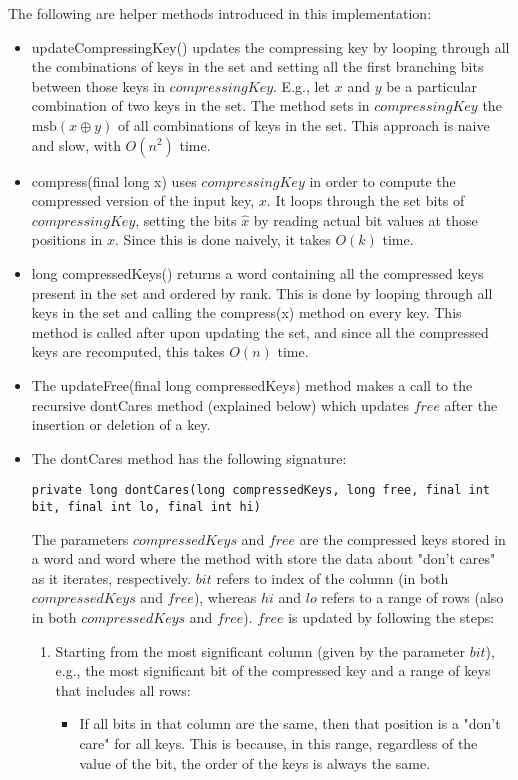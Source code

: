 The following are helper methods introduced in this implementation:
\begin{itemize}
    \item
    {\ttfamily updateCompressingKey()} updates the compressing key by looping through all the combinations of keys in the set and setting all the first branching bits between those keys in $compressingKey$. E.g., let $x$ and $y$ be a particular combination of two keys in the set. The method sets in $compressingKey$ the $\text{msb}(x \oplus y)$ of all combinations of keys in the set. This approach is naive and slow, with $O(n^2)$ time.
    
    \item
    {\ttfamily compress(final long x)} uses $compressingKey$ in order to compute the compressed version of the input key, $x$. It loops through the set bits of $compressingKey$, setting the bits $\hat x$ by reading actual bit values at those positions in $x$. Since this is done naively, it takes $O(k)$ time.

    \item
    {\ttfamily long compressedKeys()} returns a word containing all the compressed keys present in the set and ordered by rank. This is done by looping through all keys in the set and calling the {\ttfamily compress(x)} method on every key. This method is called after upon updating the set, and since all the compressed keys are recomputed, this takes $O(n)$ time.
    
    \item
    The {\ttfamily updateFree(final long compressedKeys)} method makes a call to the recursive {\ttfamily dontCares} method (explained below) which updates $free$ after the insertion or deletion of a key.

    \item
    The {\ttfamily dontCares} method has the following signature:
    \begin{lstlisting}
private long dontCares(long compressedKeys, long free, final int bit, final int lo, final int hi)
    \end{lstlisting}
    The parameters $compressedKeys$ and $free$ are the compressed keys stored in a word and word where the method with store the data about "don't cares" as it iterates, respectively. $bit$ refers to index of the column (in both $compressedKeys$ and $free$), whereas $hi$ and $lo$ refers to a range of rows (also in both $compressedKeys$ and $free$).
    $free$ is updated by following the steps:
    \begin{enumerate}
        \item
        Starting from the most significant column (given by the parameter $bit$), e.g., the most significant bit of the compressed key and a range of keys that includes all rows:
        \begin{itemize}
            \item
            If all bits in that column are the same, then that position is a "don't care" for all keys. This is because, in this range, regardless of the value of the bit, the order of the keys is always the same.
            

\end{itemize}
\end{enumerate}
\end{itemize}
